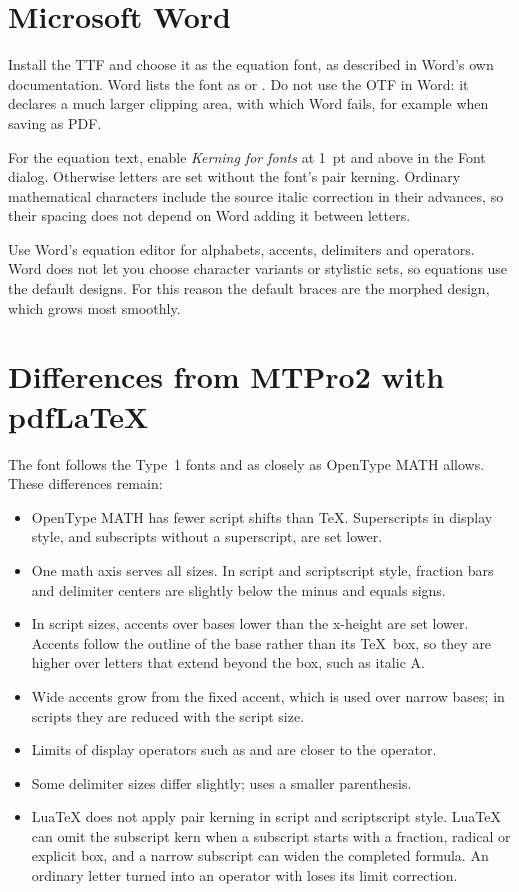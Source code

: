 \documentclass[11pt,a4paper]{article}
\begin{document}
\newpage
\section{Microsoft Word}\label{sec:word}
Install the TTF and choose it as the equation font, as described in
Word's own documentation. Word lists the font as  or
. Do not use the OTF in Word: it declares a much
larger clipping area, with which Word fails, for example when saving as
PDF.

For the equation text, enable \emph{Kerning for fonts} at 1~pt and above
in the Font dialog. Otherwise letters are set without the font's pair
kerning. Ordinary mathematical characters include the source italic
correction in their advances, so their spacing does not depend on Word
adding it between letters.

Use Word's equation editor for alphabets, accents, delimiters and
operators. Word does not let you choose character variants or stylistic
sets, so equations use the default designs. For this reason the default
braces are the morphed design, which grows most smoothly.

\section{Differences from MTPro2 with pdf\LaTeX}\label{sec:differences}
The font follows the Type~1 fonts and  as closely as
OpenType MATH allows. These differences remain:
\begin{itemize}
\item OpenType MATH has fewer script shifts than \TeX. Superscripts in
  display style, and subscripts without a superscript, are set lower.
\item One math axis serves all sizes. In script and scriptscript style,
  fraction bars and delimiter centers are slightly below the minus and
  equals signs.
\item In script sizes, accents over bases lower than the x-height are
  set lower. Accents follow the outline of the base rather than its
  \TeX\ box, so they are higher over letters that extend beyond the box,
  such as italic A.
\item Wide accents grow from the fixed accent, which is used over narrow
  bases; in scripts they are reduced with the script size.
\item Limits of display operators such as \code{\sum} and \code{\prod}
  are closer to the operator.
\item Some delimiter sizes differ slightly; \code{\dbinom} uses a
  smaller parenthesis.
\item LuaTeX does not apply pair kerning in script and scriptscript
  style. LuaTeX can omit the subscript kern when a subscript starts with
  a fraction, radical or explicit box, and a narrow subscript can widen
  the completed formula. An ordinary letter turned into an operator with
  \code{\mathop} loses its limit correction.
\end{itemize}
\end{document}
